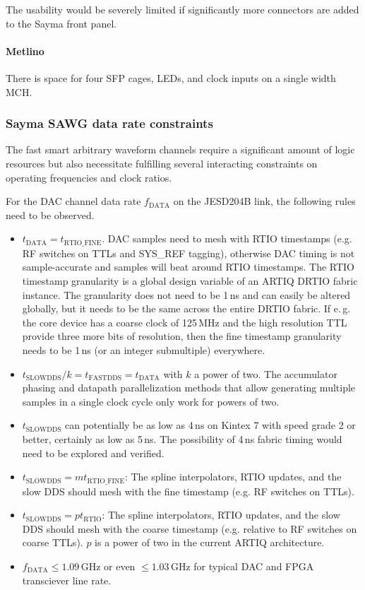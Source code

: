 \documentclass[11pt]{paper}
\begin{document}
The usability would be severely limited if significantly more connectors are added to the Sayma front panel.

\paragraph{Metlino} There is space for four SFP cages, LEDs, and clock inputs
on a single width MCH.

\subsubsection{Sayma SAWG data rate constraints}

The fast smart arbitrary waveform channels require a significant amount of logic resources but also necessitate fulfilling several interacting constraints on operating frequencies and clock ratios.

For the DAC channel data rate $f_\mathrm{DATA}$ on the JESD204B link, the following rules need to be observed.

\begin{itemize}
   \item $t_\mathrm{DATA} = t_\mathrm{RTIO\_FINE}$. DAC samples need to mesh with RTIO timestamps (e.g. RF switches on TTLs and SYS\_REF tagging), otherwise DAC timing is not sample-accurate and samples will beat around RTIO timestamps.
      The RTIO timestamp granularity is a global design variable of an ARTIQ DRTIO fabric instance.
      The granularity does not need to be 1\,ns and can easily be altered globally, but it needs to be the same across the entire DRTIO fabric.
      If e.\,g. the core device has a coarse clock of 125\,MHz and the high resolution TTL provide three more bits of resolution, then the fine timestamp granularity needs to be 1\,ns (or an integer submultiple) everywhere.
    \item $t_\mathrm{SLOWDDS}/k = t_\mathrm{FASTDDS} = t_\mathrm{DATA}$ with $k$ a power of two. The accumulator phasing and datapath parallelization methods that allow generating multiple samples in a single clock cycle only work for powers of two.
    \item $t_\mathrm{SLOWDDS}$ can potentially be as low as 4\,ns on Kintex 7 with speed grade 2 or better, certainly as low as 5\,ns. The possibility of 4\,ns fabric timing would need to be explored and verified.
    \item $t_\mathrm{SLOWDDS} = m t_\mathrm{RTIO\_FINE}$: The spline interpolators, RTIO updates, and the slow DDS should mesh with the fine timestamp (e.g. RF switches on TTLs).
    \item $t_\mathrm{SLOWDDS} = p t_\mathrm{RTIO}$: The spline interpolators, RTIO updates, and the slow DDS should mesh with the coarse timestamp (e.g. relative to RF switches on coarse TTLs). $p$ is a power of two in the current ARTIQ architecture.
    \item $f_\mathrm{DATA} \leq 1.09\,\mathrm{GHz}$ or even $ \leq
       1.03\,\mathrm{GHz}$ for typical DAC and FPGA transciever line rate.
\end{itemize}
\end{document}
